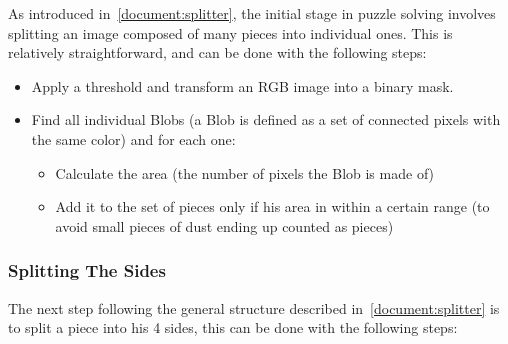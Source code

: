 \documentclass{article}
\begin{document}
As introduced in~\cref{document:splitter},  the initial stage in puzzle solving involves
splitting an image composed of many pieces into individual ones.
This is relatively straightforward, and can be done with the following steps:

\begin{itemize}
  \item Apply a threshold and transform an RGB image into a binary mask.
  \item Find all individual Blobs
  (a Blob is defined as a set of connected pixels with the same color) and for each one:

  \begin{itemize}
  \item Calculate the area (the number of pixels the Blob is made of)

  \item Add it to the set of pieces only if his area in within a certain range (to avoid small pieces of dust ending up counted as pieces)

  \end{itemize}

\end{itemize}

\subsubsection{Splitting The Sides}

The next step following the general structure described in~\cref{document:splitter}
is to split a piece into
his 4 sides, this can be done with the following steps:
\end{document}
